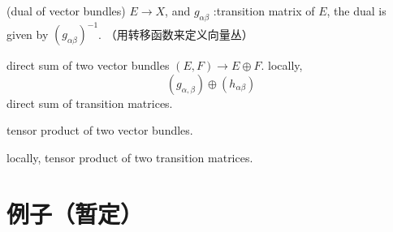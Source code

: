\begin{definition}(dual of vector bundles)
$E\to X$, and $g_{\alpha\beta}$ :transition matrix of $E$,
the dual is given by
$(g_{\alpha\beta})^{-1}$.
（用转移函数来定义向量丛）
\end{definition}

\begin{definition}
direct sum of two vector bundles $(E,F)\to E\oplus F$.
locally,
$$(g_{\alpha,\beta})\oplus(h_{\alpha\beta})$$
direct sum of transition matrices.
\end{definition}

\begin{definition}
tensor product of two vector bundles.

locally, tensor product of two transition matrices.
\end{definition}
\section{例子（暂定）}